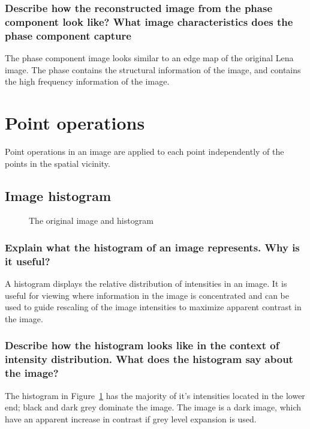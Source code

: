 \documentclass[article, 1.5space, letterpaper, 12pt, oneside, header, footer]{SydeClass}
\begin{document}
\subsubsection{Describe how the reconstructed image from the phase component look like? What image characteristics does the phase component capture}
The phase component image looks similar to an edge map of the original Lena image. The phase contains the structural information of the image, and contains the high frequency information of the image.


\section{Point operations}

Point operations in an image are applied to each point independently of the points in the spatial vicinity.

\subsection{Image histogram}

\begin{figure}[ht]
\centering
	\caption{The original image and histogram}
	\label{fig:hist-original}
\end{figure}

\subsubsection{Explain what the histogram of an image represents. Why is it useful?}

A histogram displays the relative distribution of intensities in an image. It is useful for viewing where information in the image is concentrated and can be used to guide rescaling of the image intensities to maximize apparent contrast in the image.

\subsubsection{Describe how the histogram looks like in the context of intensity distribution. What does the histogram say about the image?}

The histogram in Figure~\ref{fig:hist-original} has the majority of it's intensities located in the lower end; black and dark grey dominate the image. The image is a dark image, which have an apparent increase in contrast if grey level expansion is used.
\end{document}
